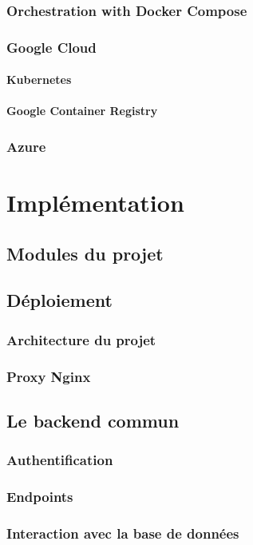 \documentclass[11pt,a4paper]{report}
\begin{document}
\subsection{Orchestration with Docker Compose}
\subsection{Google Cloud}
\subsubsection{Kubernetes}
\subsubsection{Google Container Registry}
\subsection{Azure}

\chapter{Implémentation}
\section{Modules du projet}
\section{Déploiement}
\subsection{Architecture du projet}
\subsection{Proxy Nginx}
\section{Le backend commun}
\subsection{Authentification}
\subsection{Endpoints}
\subsection{Interaction avec la base de données}
\end{document}
